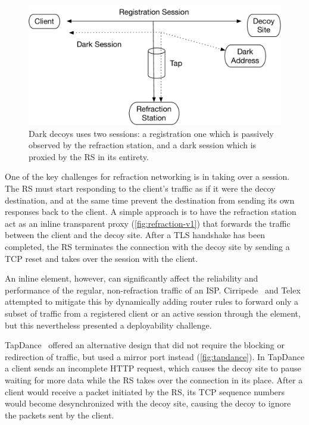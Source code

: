   \begin{figure}
    \includegraphics[width=\columnwidth]{figures/dark-decoys}
    \caption{Dark decoys uses two sessions: a registration one which is passively observed by the refraction station, and a dark session which is proxied by the RS in its entirety.}
    \label{fig:dark-decoys}
\end{figure}

One of the key challenges for refraction networking is in taking over a session. The RS must start responding to the client's traffic as if it were the decoy destination, and at the same time prevent the destination from sending its own responses back to the client. A simple approach is to have the refraction station act as an inline transparent proxy (\cref{fig:refraction-v1}) that forwards the traffic between the client and the decoy site. After a TLS handshake has been completed, the RS terminates the connection with the decoy site by sending a TCP reset and takes over the session with the client.

An inline element, however, can significantly affect the reliability and performance of the regular, non-refraction traffic of an ISP. Cirripede~\cite{cirripede} and Telex~\cite{telex} attempted to mitigate this by dynamically adding router rules to forward only a subset of traffic from a registered client or an active session through the element, but this nevertheless presented a deployability challenge.

TapDance~\cite{tapdance} offered an alternative design that did not require the blocking or redirection of traffic, but used a mirror port instead (\cref{fig:tapdance}). In TapDance a client sends an incomplete HTTP request, which causes the decoy site to pause waiting for more data while the RS takes over the connection in its place. After a client would receive a packet initiated by the RS, its TCP sequence numbers would become desynchronized with the decoy site, causing the decoy to ignore the packets sent by the client.

